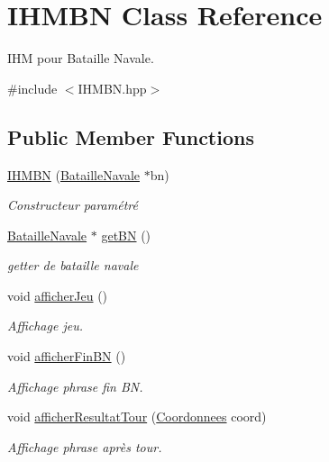 \hypertarget{classIHMBN}{\section{I\-H\-M\-B\-N Class Reference}
\label{classIHMBN}
}


I\-H\-M pour Bataille Navale.  




{\ttfamily \#include $<$I\-H\-M\-B\-N.\-hpp$>$}

\subsection*{Public Member Functions}
\begin{DoxyCompactItemize}
\item 
\hyperlink{classIHMBN_a616379b65d6a1ada95de86900f5bed1a}{I\-H\-M\-B\-N} (\hyperlink{classBatailleNavale}{Bataille\-Navale} $\ast$bn)
\begin{DoxyCompactList}\small\item\em Constructeur paramétré \end{DoxyCompactList}\item 
\hyperlink{classBatailleNavale}{Bataille\-Navale} $\ast$ \hyperlink{classIHMBN_a61d5cdc4b7978ce96155297418293da6}{get\-B\-N} ()
\begin{DoxyCompactList}\small\item\em getter de bataille navale \end{DoxyCompactList}\item 
void \hyperlink{classIHMBN_a77d62aa5b283ce27ad69f5f0b836d44c}{afficher\-Jeu} ()
\begin{DoxyCompactList}\small\item\em Affichage jeu. \end{DoxyCompactList}\item 
void \hyperlink{classIHMBN_afda1231ea414fb96efaa6c3159376280}{afficher\-Fin\-B\-N} ()
\begin{DoxyCompactList}\small\item\em Affichage phrase fin B\-N. \end{DoxyCompactList}\item 
void \hyperlink{classIHMBN_ae2583075461cc04159e46f343a89c062}{afficher\-Resultat\-Tour} (\hyperlink{classCoordonnees}{Coordonnees} coord)
\begin{DoxyCompactList}\small\item\em Affichage phrase après tour. \end{DoxyCompactList}\item 

\end{DoxyCompactItemize}
